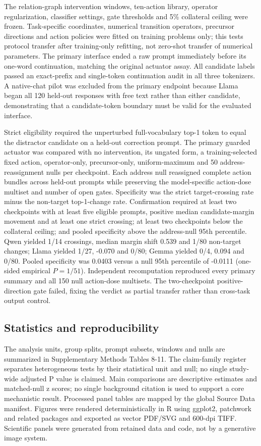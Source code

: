 \documentclass[12pt]{article}
\newcommand{\codeid}[1]{{\ttfamily\footnotesize #1}}
\begin{document}
The relation-graph intervention windows, ten-action library, operator regularization, classifier settings, gate thresholds and 5\% collateral ceiling were frozen. Task-specific coordinates, numerical transition operators, precursor directions and action policies were fitted on training problems only; this tests protocol transfer after training-only refitting, not zero-shot transfer of numerical parameters. The primary interface ended a raw prompt immediately before its one-word continuation, matching the original actuator assay. All candidate labels passed an exact-prefix and single-token continuation audit in all three tokenizers. A native-chat pilot was excluded from the primary endpoint because Llama began all 120 held-out responses with free text rather than either candidate, demonstrating that a candidate-token boundary must be valid for the evaluated interface.

Strict eligibility required the unperturbed full-vocabulary top-1 token to equal the distractor candidate on a held-out correction prompt. The primary guarded actuator was compared with no intervention, its ungated form, a training-selected fixed action, operator-only, precursor-only, uniform-maximum and 50 address-reassignment nulls per checkpoint. Each address null reassigned complete action bundles across held-out prompts while preserving the model-specific action-dose multiset and number of open gates. Specificity was the strict target-crossing rate minus the non-target top-1-change rate. Confirmation required at least two checkpoints with at least five eligible prompts, positive median candidate-margin movement and at least one strict crossing; at least two checkpoints below the collateral ceiling; and pooled specificity above the address-null 95th percentile. Qwen yielded 1/14 crossings, median margin shift 0.539 and 1/80 non-target changes; Llama yielded 1/27, -0.070 and 0/80; Gemma yielded 0/4, 0.094 and 0/80. Pooled specificity was 0.0403 versus a null 95th percentile of -0.0111 (one-sided empirical \(P=1/51\)). Independent recomputation reproduced every primary summary and all 150 null action-dose multisets. The two-checkpoint positive-direction gate failed, fixing the verdict as partial transfer rather than cross-task output control.

\subsection*{Statistics and reproducibility}

The analysis units, group splits, prompt subsets, windows and nulls are summarized in Supplementary Methods Tables 8-11. The claim-family register separates heterogeneous tests by their statistical unit and null; no single study-wide adjusted P value is claimed. Main comparisons are descriptive estimates and matched-null z scores; no single background citation is used to support a core mechanistic result. Processed panel tables are mapped by the global Source Data manifest. Figures were rendered deterministically in R using \codeid{ggplot2}, \codeid{patchwork} and related packages and exported as vector PDF/SVG and 600-dpi TIFF. Scientific panels were generated from retained data and code, not by a generative image system.
\end{document}

